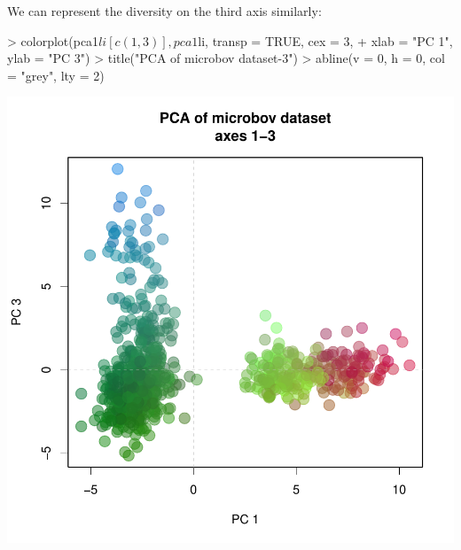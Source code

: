 \documentclass{article}
\begin{document}
We can represent the diversity on the third axis similarly:
\begin{Schunk}
\begin{Sinput}
> colorplot(pca1$li[c(1, 3)], pca1$li, transp = TRUE, cex = 3, 
+     xlab = "PC 1", ylab = "PC 3")
> title("PCA of microbov dataset-3")
> abline(v = 0, h = 0, col = "grey", lty = 2)
\end{Sinput}
\end{Schunk}
\includegraphics{figs/base-080}





\end{document}
